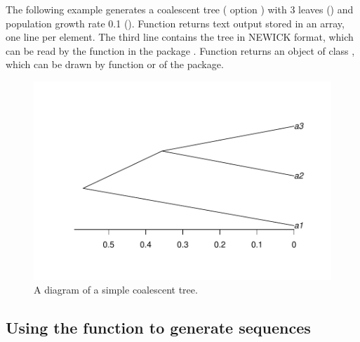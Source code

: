 The following example generates a coalescent tree ( option )
with 3 leaves ()
and population growth rate 0.1
(). Function  returns  text output
stored in an array, one line per element.
The third line contains the tree in NEWICK format, which can
be read by the  function in the  package
\citep{Paradis2004}.
Function  returns an object of class ,
which can be drawn by function  or 
of the  package.
\begin{figure}[h]
\begin{center}
\includegraphics[width=5.0in]{./phyclust-include/f-ms}
\caption{A diagram of a simple coalescent tree.}
\label{fig:ms}
\end{center}
\end{figure}




\subsection[Using the seqgen() function to generate sequences]{Using the  function to generate sequences}
\label{sec:seqgen}

